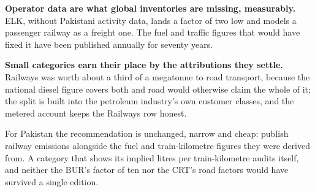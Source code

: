 \textbf{Operator data are what global inventories are missing, measurably.} ELK, without
Pakistani activity data, lands a factor of two low and models a passenger railway as a
freight one. The fuel and traffic figures that would have fixed it have been published
annually for seventy years.

\textbf{Small categories earn their place by the attributions they settle.} Railways was
worth about a third of a megatonne to road transport, because the national diesel figure
covers both and road would otherwise claim the whole of it; the split is built into the
petroleum industry's own customer classes, and the metered account keeps the Railways row
honest.

For Pakistan the recommendation is unchanged, narrow and cheap: publish railway emissions
alongside the fuel and train-kilometre figures they were derived from. A category that
shows its implied litres per train-kilometre audits itself, and neither the BUR's factor of
ten nor the CRT's road factors would have survived a single edition.
